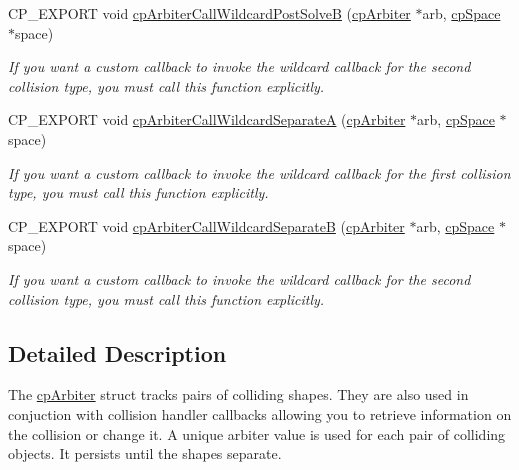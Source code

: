 \begin{DoxyCompactItemize}
\mbox{\label{group__cpArbiter_gad32bdc2f19665e8eaff4323381a07ab3}} 
C\+P\+\_\+\+E\+X\+P\+O\+RT void \hyperlink{group__cpArbiter_gad32bdc2f19665e8eaff4323381a07ab3}{cp\+Arbiter\+Call\+Wildcard\+Post\+SolveB} (\hyperlink{structcpArbiter}{cp\+Arbiter} $\ast$arb, \hyperlink{structcpSpace}{cp\+Space} $\ast$space)
\begin{DoxyCompactList}\small\item\em If you want a custom callback to invoke the wildcard callback for the second collision type, you must call this function explicitly. \end{DoxyCompactList}\item 
\mbox{\label{group__cpArbiter_gae49f69b06593a6fb3b50929bb6ba9cb7}} 
C\+P\+\_\+\+E\+X\+P\+O\+RT void \hyperlink{group__cpArbiter_gae49f69b06593a6fb3b50929bb6ba9cb7}{cp\+Arbiter\+Call\+Wildcard\+SeparateA} (\hyperlink{structcpArbiter}{cp\+Arbiter} $\ast$arb, \hyperlink{structcpSpace}{cp\+Space} $\ast$space)
\begin{DoxyCompactList}\small\item\em If you want a custom callback to invoke the wildcard callback for the first collision type, you must call this function explicitly. \end{DoxyCompactList}\item 
\mbox{\label{group__cpArbiter_gaf221f38af85d95f38ee9a15bcf15724a}} 
C\+P\+\_\+\+E\+X\+P\+O\+RT void \hyperlink{group__cpArbiter_gaf221f38af85d95f38ee9a15bcf15724a}{cp\+Arbiter\+Call\+Wildcard\+SeparateB} (\hyperlink{structcpArbiter}{cp\+Arbiter} $\ast$arb, \hyperlink{structcpSpace}{cp\+Space} $\ast$space)
\begin{DoxyCompactList}\small\item\em If you want a custom callback to invoke the wildcard callback for the second collision type, you must call this function explicitly. \end{DoxyCompactList}\end{DoxyCompactItemize}


\subsection{Detailed Description}
The \hyperlink{structcpArbiter}{cp\+Arbiter} struct tracks pairs of colliding shapes. They are also used in conjuction with collision handler callbacks allowing you to retrieve information on the collision or change it. A unique arbiter value is used for each pair of colliding objects. It persists until the shapes separate. 


